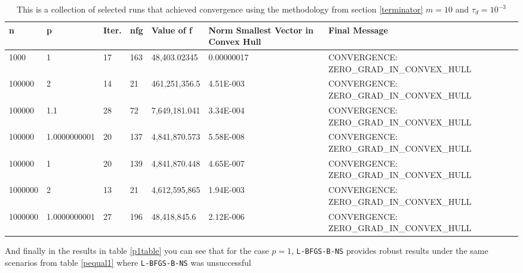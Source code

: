 \begin{center}
  \begin{table}
    \footnotesize
    \begin{tabular}{|l|l|p{0.5cm}|l|l|p{1.4cm}|p{4.9cm}|}
      \hline
      n & p & Iter. & nfg & Value of f & Norm Smallest Vector in Convex Hull & Final Message\\ \hline
      1000 & 1 & 17 & 163 & 48,403.02345 &0.00000017 & CONVERGENCE: ZERO\_GRAD\_IN\_CONVEX\_HULL \\
      100000 & 2 & 14 & 21 & 461,251,356.5 & 4.51E-003 & CONVERGENCE: ZERO\_GRAD\_IN\_CONVEX\_HULL \\ 
      100000 & 1.1 & 28 & 72 & 7,649,181.041 & 3.34E-004 & CONVERGENCE: ZERO\_GRAD\_IN\_CONVEX\_HULL \\ 
      100000 & 1.0000000001 & 20 & 137 & 4,841,870.573 & 5.58E-008 & CONVERGENCE: ZERO\_GRAD\_IN\_CONVEX\_HULL \\ 
      100000 & 1 & 20 & 139 & 4,841,870.448 & 4.65E-007 & CONVERGENCE: ZERO\_GRAD\_IN\_CONVEX\_HULL \\ 
      1000000 & 2 & 13 & 21 & 4,612,595,865 & 1.94E-003 & CONVERGENCE: ZERO\_GRAD\_IN\_CONVEX\_HULL \\ 
      1000000 & 1.0000000001 & 27 & 196 & 48,418,845.6 & 2.12E-006 & CONVERGENCE: ZERO\_GRAD\_IN\_CONVEX\_HULL \\ 
      \hline
    \end{tabular}
    \caption[Selected Runs Changing Dimensions]{This is a collection of selected runs that achieved convergence using the methodology from section \eqref{terminator} $m = 10$ and $\tau_d = 10^{-3}$}
    \label{sel}
  \end{table}
\end{center}

And finally in the results in table \ref{p1table} you can see that for the case $p = 1$, \texttt{L-BFGS-B-NS} provides robust results under the same scenarios from table \ref{pequal1} where \texttt{L-BFGS-B-NS} was unsuccessful

